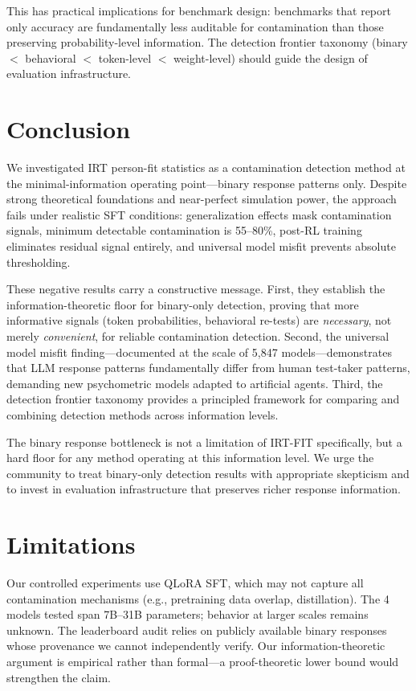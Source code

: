 \documentclass[11pt,a4paper]{article}
\begin{document}
This has practical implications for benchmark design: benchmarks that report only accuracy are fundamentally less auditable for contamination than those preserving probability-level information.
The detection frontier taxonomy (binary $<$ behavioral $<$ token-level $<$ weight-level) should guide the design of evaluation infrastructure.

\section{Conclusion}

We investigated IRT person-fit statistics as a contamination detection method at the minimal-information operating point---binary response patterns only.
Despite strong theoretical foundations and near-perfect simulation power, the approach fails under realistic SFT conditions: generalization effects mask contamination signals, minimum detectable contamination is 55--80\%, post-RL training eliminates residual signal entirely, and universal model misfit prevents absolute thresholding.

These negative results carry a constructive message.
First, they establish the information-theoretic floor for binary-only detection, proving that more informative signals (token probabilities, behavioral re-tests) are \emph{necessary}, not merely \emph{convenient}, for reliable contamination detection.
Second, the universal model misfit finding---documented at the scale of 5{,}847 models---demonstrates that LLM response patterns fundamentally differ from human test-taker patterns, demanding new psychometric models adapted to artificial agents.
Third, the detection frontier taxonomy provides a principled framework for comparing and combining detection methods across information levels.

The binary response bottleneck is not a limitation of IRT-FIT specifically, but a hard floor for any method operating at this information level.
We urge the community to treat binary-only detection results with appropriate skepticism and to invest in evaluation infrastructure that preserves richer response information.

\section*{Limitations}

Our controlled experiments use QLoRA SFT, which may not capture all contamination mechanisms (e.g., pretraining data overlap, distillation).
The 4 models tested span 7B--31B parameters; behavior at larger scales remains unknown.
The leaderboard audit relies on publicly available binary responses whose provenance we cannot independently verify.
Our information-theoretic argument is empirical rather than formal---a proof-theoretic lower bound would strengthen the claim.
\end{document}

